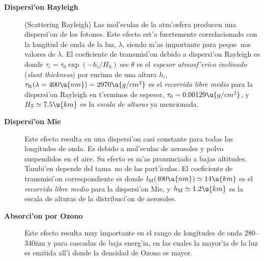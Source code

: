\begin{description}

\item[\textbf{Dispersi'on Rayleigh}] (Scattering Rayleigh) Las
  mol'eculas de la atm'osfera producen una dispersi'on de los
  fotones. Este efecto est'a fuertemente correlacionado con la
  longitud de onda de la luz, $\lambda$, siendo m'as importante para
  peque~nos valores de $\lambda$. El coeficiente de transmisi'on
  debido a dispersi'on Rayleigh es
%
  \Rayleigheq
%
  donde $\tau_i = \tau_0 \exp(-h_i/H_{\mathrm{S}}) \sec\theta$ es el
  \emph{espesor atmosf'erico inclinado} (\emph{slant thickness}) por
  encima de una altura $h_i$, $\tau_{\mathrm{R}}(\lambda=400\u{nm}) =
  2970\u{g/cm^2}$ es el \emph{recorrido libre medio} para la
  dispersi'on Rayleigh en t'erminos de espesor, $\tau_0 =
  0.00129\u{g/cm^2}$, y $H_{\mathrm{S}} \simeq 7.5\u{km}$ es la
  \emph{escala de alturas} ya mencionada.
  
\item[\textbf{Dispersi'on Mie}] Este efecto resulta en una dispersi'on 
  casi constante para todas las longitudes de onda. Es debido a
  mol'eculas de aerosoles y polvo suspendidos en el aire. Su efecto es
  m'as pronunciado a bajas altitudes. Tambi'en depende del tama~no de
  las part'iculas. El coeficiente de transmisi'on correspondiente es
%
  \Mieeq
%
  donde $l_{\mathrm{M}}(400\u{nm}) \simeq 14\u{km}$ es el
  \emph{recorrido libre medio} para la dispersi'on Mie, y
  $h_{\mathrm{M}} \simeq 1.2\u{km}$ es la escala de alturas de la
  distribuci'on de aerosoles.
  
\item[\textbf{Absorci'on por Ozono}] Este efecto resulta muy
  importante en el rango de longitudes de onda 280--340\u{nm} y para
  cascadas de baja energ'ia, en las cuales la mayor'ia de la luz
  \Cerenkov es emitida all'i donde la densidad de Ozono es mayor.

\end{description}

\endinput
%
